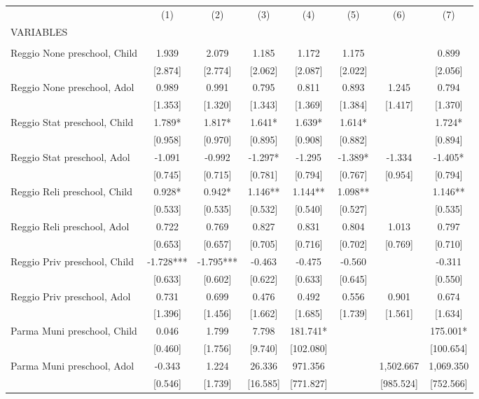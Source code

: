 \begin{tabular}{lccccccc} \hline
 & (1) & (2) & (3) & (4) & (5) & (6) & (7) \\
VARIABLES &  &  &  &  &  &  &  \\ \hline
 &  &  &  &  &  &  &  \\
Reggio None preschool, Child & 1.939 & 2.079 & 1.185 & 1.172 & 1.175 &  & 0.899 \\
 & [2.874] & [2.774] & [2.062] & [2.087] & [2.022] &  & [2.056] \\
Reggio None preschool, Adol & 0.989 & 0.991 & 0.795 & 0.811 & 0.893 & 1.245 & 0.794 \\
 & [1.353] & [1.320] & [1.343] & [1.369] & [1.384] & [1.417] & [1.370] \\
Reggio Stat preschool, Child & 1.789* & 1.817* & 1.641* & 1.639* & 1.614* &  & 1.724* \\
 & [0.958] & [0.970] & [0.895] & [0.908] & [0.882] &  & [0.894] \\
Reggio Stat preschool, Adol & -1.091 & -0.992 & -1.297* & -1.295 & -1.389* & -1.334 & -1.405* \\
 & [0.745] & [0.715] & [0.781] & [0.794] & [0.767] & [0.954] & [0.794] \\
Reggio Reli preschool, Child & 0.928* & 0.942* & 1.146** & 1.144** & 1.098** &  & 1.146** \\
 & [0.533] & [0.535] & [0.532] & [0.540] & [0.527] &  & [0.535] \\
Reggio Reli preschool, Adol & 0.722 & 0.769 & 0.827 & 0.831 & 0.804 & 1.013 & 0.797 \\
 & [0.653] & [0.657] & [0.705] & [0.716] & [0.702] & [0.769] & [0.710] \\
Reggio Priv preschool, Child & -1.728*** & -1.795*** & -0.463 & -0.475 & -0.560 &  & -0.311 \\
 & [0.633] & [0.602] & [0.622] & [0.633] & [0.645] &  & [0.550] \\
Reggio Priv preschool, Adol & 0.731 & 0.699 & 0.476 & 0.492 & 0.556 & 0.901 & 0.674 \\
 & [1.396] & [1.456] & [1.662] & [1.685] & [1.739] & [1.561] & [1.634] \\
Parma Muni preschool, Child & 0.046 & 1.799 & 7.798 & 181.741* &  &  & 175.001* \\
 & [0.460] & [1.756] & [9.740] & [102.080] &  &  & [100.654] \\
Parma Muni preschool, Adol & -0.343 & 1.224 & 26.336 & 971.356 &  & 1,502.667 & 1,069.350 \\
 & [0.546] & [1.739] & [16.585] & [771.827] &  & [985.524] & [752.566] \\

\end{tabular}
